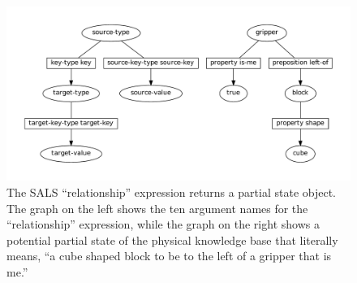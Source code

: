 \begin{figure}
\centering
\includegraphics[width=12cm]{gfx/relationship_partial_state_graph}
\caption[The SALS ``relationship'' expression returns a partial state
  object.]{The SALS ``relationship'' expression returns a partial
  state object.  The graph on the left shows the ten argument names
  for the ``relationship'' expression, while the graph on the right
  shows a potential partial state of the physical knowledge base that
  literally means, ``a cube shaped block to be to the left of a
  gripper that is me.''}
\label{figure:relationship_partial_state_graph}
\end{figure}

